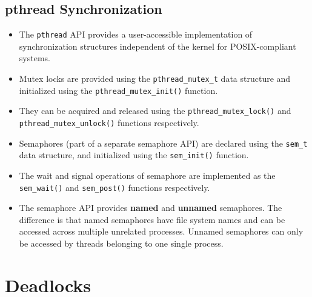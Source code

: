 \documentclass{article}
\theoremstyle{plain}
\theoremstyle{definition}
\begin{document}
\subsection{pthread Synchronization}
\begin{itemize}
    \item The \texttt{pthread} API provides a user-accessible implementation of synchronization structures independent of the kernel for POSIX-compliant systems.
    
    \item Mutex locks are provided using the \texttt{pthread\_mutex\_t} data structure and initialized using the \texttt{pthread\_mutex\_init()} function. 
    
    
    \item They can be acquired and released using the \texttt{pthread\_mutex\_lock()} and \texttt{pthread\_mutex\_unlock()} functions respectively. 
    
    \item Semaphores (part of a separate semaphore API) are declared using the \texttt{sem\_t} data structure, and initialized using the \texttt{sem\_init()} function. 
    
    \item The wait and signal operations of semaphore are implemented as the \texttt{sem\_wait()} and \texttt{sem\_post()} functions respectively. 
    
    \item The semaphore API provides \textbf{named} and \textbf{unnamed} semaphores. The difference is that named semaphores have file system names and can be accessed across multiple unrelated processes. Unnamed semaphores can only be accessed by threads belonging to one single process. 
\end{itemize}

\section{Deadlocks}
\end{document}
